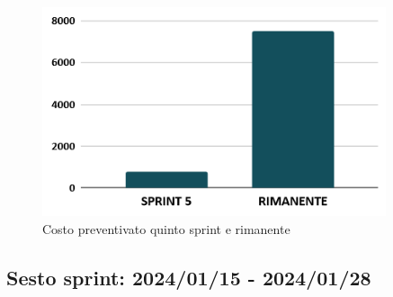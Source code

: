 \begin{figure}[h!]
    \centering
    \includegraphics[width=0.9\textwidth]{prev5costo.png}
    \caption{Costo preventivato quinto sprint e rimanente}
    \label{fig:preventivocostoquintosprint}
\end{figure}

\newpage

\subsection{Sesto sprint: 2024/01/15 - 2024/01/28}
